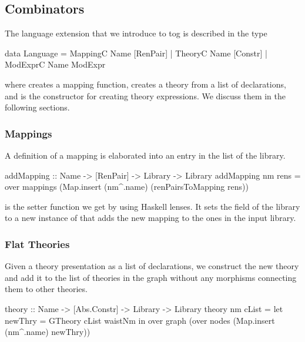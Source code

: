 \subsection{Combinators}
\label{subsec:combinatorsImpl}
The language extension that we introduce to tog is described in the type  
\begin{togcode}
data Language = 
    MappingC Name [RenPair]
  | TheoryC Name [Constr]
  | ModExprC Name ModExpr
\end{togcode}
\noindent where  creates a mapping function,  creates a theory from a list of declarations, and  is the constructor for creating theory expressions. We discuss them in the following sections. 


\subsubsection{Mappings}
A definition of a mapping is elaborated into an entry in the  list of the library. 
\begin{hscode}
addMapping :: Name -> [RenPair] -> Library -> Library
addMapping nm rens = 
   over mappings (Map.insert (nm^.name) (renPairsToMapping rens))
\end{hscode}
\noindent {} is the setter function we get by using Haskell lenses. It sets the  field of the library to a new instance of  that adds the new mapping to the ones in the input library. 

\subsubsection{Flat Theories}
Given a theory presentation as a list of declarations, we construct the new theory and add it to the list of theories in the graph without any morphisms connecting them to other theories. 
\begin{hscode}
theory :: Name -> [Abs.Constr] -> Library -> Library
theory nm cList =
  let newThry  = GTheory cList waistNm
  in  over graph (over nodes (Map.insert (nm^.name) newThry))
\end{hscode}


